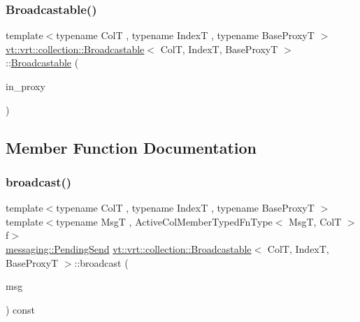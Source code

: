 \mbox{\label{structvt_1_1vrt_1_1collection_1_1_broadcastable_a62e91c5dfe22893acb08c01289de3941}} 
\subsubsection{\texorpdfstring{Broadcastable()}{Broadcastable()}\hspace{0.1cm}{\footnotesize\ttfamily [4/4]}}
{\footnotesize\ttfamily template$<$typename ColT , typename IndexT , typename Base\+ProxyT $>$ \\
\hyperlink{structvt_1_1vrt_1_1collection_1_1_broadcastable}{vt\+::vrt\+::collection\+::\+Broadcastable}$<$ ColT, IndexT, Base\+ProxyT $>$\+::\hyperlink{structvt_1_1vrt_1_1collection_1_1_broadcastable}{Broadcastable} (\begin{DoxyParamCaption}\item[{\hyperlink{namespacevt_a1b417dd5d684f045bb58a0ede70045ac}{Virtual\+Proxy\+Type} const}]{in\+\_\+proxy }\end{DoxyParamCaption})}



\subsection{Member Function Documentation}
\mbox{\label{structvt_1_1vrt_1_1collection_1_1_broadcastable_a0a08e1ab7c78e36b3ecb5b6a4d399dab}} 
\subsubsection{\texorpdfstring{broadcast()}{broadcast()}\hspace{0.1cm}{\footnotesize\ttfamily [1/6]}}
{\footnotesize\ttfamily template$<$typename ColT , typename IndexT , typename Base\+ProxyT $>$ \\
template$<$typename MsgT , Active\+Col\+Member\+Typed\+Fn\+Type$<$ Msg\+T, Col\+T $>$ f$>$ \\
\hyperlink{structvt_1_1messaging_1_1_pending_send}{messaging\+::\+Pending\+Send} \hyperlink{structvt_1_1vrt_1_1collection_1_1_broadcastable}{vt\+::vrt\+::collection\+::\+Broadcastable}$<$ ColT, IndexT, Base\+ProxyT $>$\+::broadcast (\begin{DoxyParamCaption}\item[{MsgT $\ast$}]{msg }\end{DoxyParamCaption}) const}

